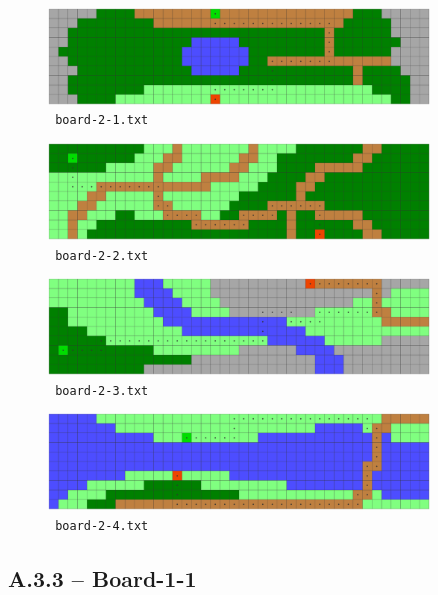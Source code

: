 \newpage

\begin{figure}[H]
\centering
\includegraphics[width=0.9\textwidth]{images/board-2-1}
\caption{\texttt{~board-2-1.txt~}}
\end{figure}

\begin{figure}[H]
\centering
\includegraphics[width=0.9\textwidth]{images/board-2-2}
\caption{\texttt{~board-2-2.txt~}}
\end{figure}

\begin{figure}[H]
\centering
\includegraphics[width=0.9\textwidth]{images/board-2-3}
\caption{\texttt{~board-2-3.txt~}}
\end{figure}

\begin{figure}[H]
\centering
\includegraphics[width=0.9\textwidth]{images/board-2-4}
\caption{\texttt{~board-2-4.txt~}}
\end{figure}

\newpage
\subsection*{A.3.3 -- Board-1-1}

